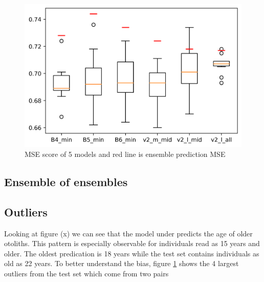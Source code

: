 \documentclass[10pt,letterpaper]{article}
\begin{document}
\begin{figure}[h!]
  \centering
  \begin{minipage}[b]{0.49\textwidth}
  \includegraphics[scale=0.2]{results/box_plot_models_acc.png}
    \caption{MSE score of 5 models and red line is ensemble prediction MSE}
   \label{marker5}
  \end{minipage}
  \hfill
\end{figure}


\subsection*{Ensemble of ensembles}

\subsection*{Outliers}

Looking at figure (x) we can see that the model under predicts the age of older otoliths. This pattern is especially observable for individuals read as 15 years and older. The oldest predication is 18 years while the test set contains individuals as old as 22 years. To better understand the bias, figure \ref{marker5} shows the 4 largest outliers from the test set which come from two pairs
\end{document}

